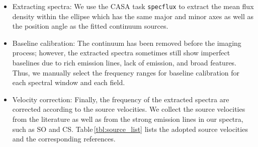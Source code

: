 \documentclass[twocolumn]{aastex62}
\begin{document}
\begin{itemize}
  \item Extracting spectra:  We use the CASA task \texttt{specflux} to extract the mean flux density within the ellipse which has the same major and minor axes as well as the position angle as the fitted continuum sources.
  \item Baseline calibration:  The continuum has been removed before the imaging process; however, the extracted spectra sometimes still show imperfect baselines due to rich emission lines, lack of emission, and broad features.  Thus, we manually select the frequency ranges for baseline calibration for each spectral window and each field.
  \item Velocity correction:  Finally, the frequency of the extracted spectra are corrected according to the source velocities.  We collect the source velocities from the literature as well as from the strong emission lines in our spectra, such as SO and CS.  Table\,\ref{tbl:source_list} lists the adopted source velocities and the corresponding references.
\end{itemize}
\end{document}
